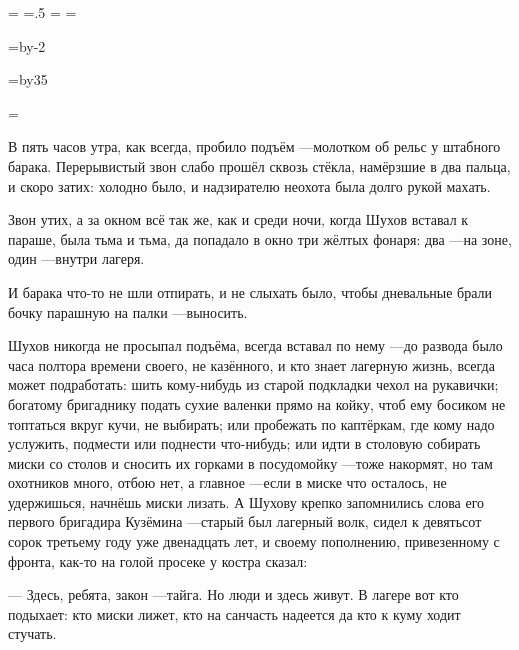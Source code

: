 \pdfpagewidth=297mm
\pdfpageheight=210mm
\pdfhorigin=1in
\pdfvorigin=0pt

\shhtotal=\pdfpagewidth
\htotal=.5\shhtotal
\vtotal=\pdfpageheight
\shoutline=0pt
\shstaplewidth=0pt
\shcrop=0pt
\shfootline={}

\horigin=11.78812mm
\hsize=\htotal \advance\hsize by-2\horigin

\vorigin=12.8mm
\vsize=\topskip \advance\vsize by35\baselineskip

\footline={\line{\hss\tenrm\folio\hss}}

 

\def\dash{\unskip\nobreak\space---\space}
\def\Dash{\hbox{---}\nobreak\space}

\begingroup
\nopagenumbers
\line{}\vfil\eject
\line{}\vfil\eject
\endgroup
{}

В пять часов утра, как всегда, пробило подъём \dash молотком об рельс у штабного барака.
Перерывистый звон слабо прошёл сквозь стёкла, намёрзшие в два пальца, и скоро затих: холодно
было, и надзирателю неохота была долго рукой махать.

Звон утих, а за окном всё так же, как и среди ночи, когда Шухов вставал к параше, была тьма и
тьма, да попадало в окно три жёлтых фонаря: два \dash на зоне, один \dash внутри лагеря.

И барака что-то не шли отпирать, и не слыхать было, чтобы дневальные брали бочку парашную на
палки \dash выносить.

Шухов никогда не просыпал подъёма, всегда вставал по нему \dash до развода было часа полтора
времени своего, не казённого, и кто знает лагерную жизнь, всегда может подработать: шить
кому-нибудь из старой подкладки чехол на рукавички; богатому бригаднику подать сухие
валенки прямо на койку, чтоб ему босиком не топтаться вкруг кучи, не выбирать; или пробежать
по каптёркам, где кому надо услужить, подмести или поднести что-нибудь; или идти в столовую
собирать миски со столов и сносить их горками в посудомойку \dash тоже накормят, но там
охотников много, отбою нет, а главное \dash если в миске что осталось, не удержишься, начнёшь
миски лизать. А Шухову крепко запомнились слова его первого бригадира Кузёмина \dash старый был
лагерный волк, сидел к девятьсот сорок третьему году уже двенадцать лет, и своему
пополнению, привезенному с фронта, как-то на голой просеке у костра сказал:

--- Здесь, ребята, закон \dash тайга. Но люди и здесь живут. В лагере вот кто подыхает: кто миски
лижет, кто на санчасть надеется да кто к куму ходит стучать.

